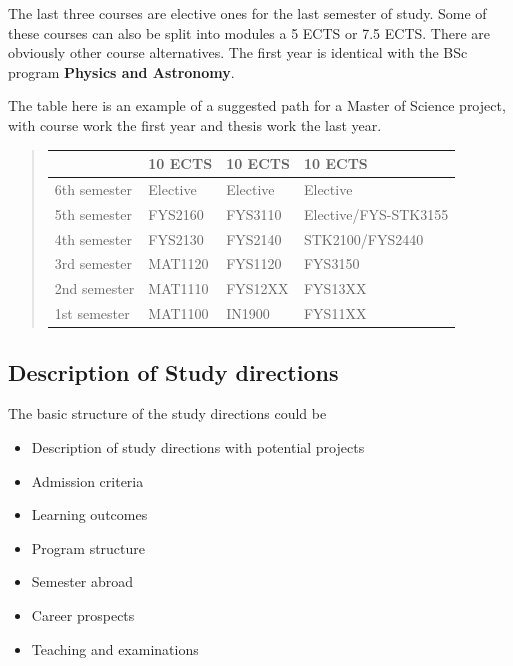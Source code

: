 \documentclass[%
oneside,                 %
final,                   %
10pt]{article}
\begin{document}
\noindent
The last three courses are elective ones for the last semester of
study. Some of these courses can also be split into modules a 5 ECTS
or 7.5 ECTS.  There are obviously other course alternatives.  The
first year is identical with the BSc program \textbf{Physics and Astronomy}.

The table here is an example of a suggested path for a Master of Science project,
with course work the first year and thesis work the last year.


\begin{quote}
\begin{tabular}{llll}
\hline
\multicolumn{1}{l}{  } & \multicolumn{1}{l}{ 10 ECTS } & \multicolumn{1}{l}{ 10 ECTS } & \multicolumn{1}{l}{ 10 ECTS } \\
\hline
6th semester & Elective & Elective & Elective             \\
\hline
5th semester & FYS2160  & FYS3110  & Elective/FYS-STK3155 \\
\hline
4th semester & FYS2130  & FYS2140  & STK2100/FYS2440      \\
\hline
3rd semester & MAT1120  & FYS1120  & FYS3150              \\
\hline
2nd semester & MAT1110  & FYS12XX  & FYS13XX              \\
\hline
1st semester & MAT1100  & IN1900   & FYS11XX              \\
\hline
\end{tabular}
\end{quote}

\noindent
\subsection*{Description of Study directions}

The basic structure of the study directions could be

\begin{itemize}
\item Description of study directions with potential projects

\item Admission criteria

\item Learning outcomes

\item Program structure

\item Semester abroad

\item Career prospects

\item Teaching and examinations
\end{itemize}
\end{document}
